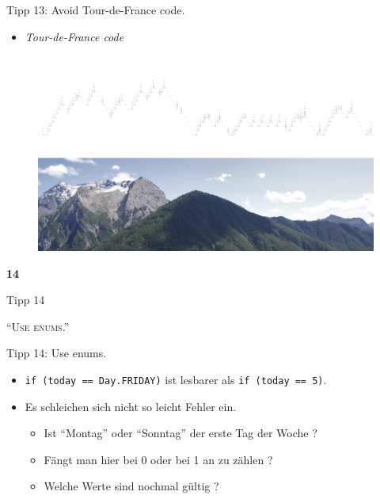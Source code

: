 \documentclass[18pt]{beamer}
\newcommand{\quotes}[1]{``#1''}
\begin{document}
\begin{frame}{Tipp 13: Avoid Tour-de-France code.}
    \begin{itemize}
        \item \textit{Tour-de-France code}
    \end{itemize}

    \begin{figure}
        \includegraphics[scale=.4]{img/tourdefrancecode2.png}
    \end{figure}
\end{frame}

\begin{frame}{\quad}
    \center
    \Huge{\textbf{14}}
\end{frame}

\begin{frame}{Tipp 14}
    \begin{block}{}
        \center
        \textsc{\quotes{Use enums.}}
    \end{block}
\end{frame}

\begin{frame}{Tipp 14: Use enums.}
    \begin{itemize}
        \item \texttt{if (today == Day.FRIDAY)} ist lesbarer als \texttt{if (today == 5)}.
        \item Es schleichen sich nicht so leicht Fehler ein.
        \begin{itemize}
            \item Ist \quotes{Montag} oder \quotes{Sonntag} der erste Tag der Woche ?
            \item Fängt man hier bei 0 oder bei 1 an zu zählen ?
            \item Welche Werte sind nochmal gültig ?
        \end{itemize}
    \end{itemize}
\end{frame}
\end{document}
